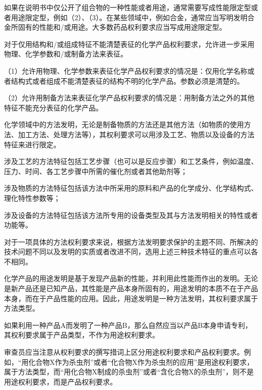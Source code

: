 如果在说明书中仅公开了组合物的一种性能或者用途，通常需要写成性能限定型或者用途限定型，例如（2）、（3）。在某些领域中，例如合金，通常应当写明发明合金所固有的性能和/或用途。大多数药品权利要求应当写成用途限定型。

对于仅用结构和/或组成特征不能清楚表征的化学产品权利要求，允许进一步采用物理、化学参数和/或制备方法来表征。

{\setlength{\parindent}{17.1bp}（1）允许用物理、化学参数来表征化学产品权利要求的情况是：仅用化学名称或者结构式或者组成不能清楚表征的结构不明的化学产品。参数必须是清楚的。\par}

{\setlength{\parindent}{17.1bp}（2）允许用制备方法来表征化学产品权利要求的情况是：用制备方法之外的其他特征不能充分表征的化学产品。\par}

化学领域中的方法发明，无论是制备物质的方法还是其他方法（如物质的使用方法、加工方法、处理方法等），其权利要求可以用涉及工艺、物质以及设备的方法特征来进行限定。

涉及工艺的方法特征包括工艺步骤（也可以是反应步骤）和工艺条件，例如温度、压力、时间、各工艺步骤中所需的催化剂或者其他助剂等；

涉及物质的方法特征包括该方法中所采用的原料和产品的化学成分、化学结构式、理化特性参数等；

涉及设备的方法特征包括该方法所专用的设备类型及其与方法发明相关的特性或者功能等。

对于一项具体的方法权利要求来说，根据方法发明要求保护的主题不同、所解决的技术问题不同以及发明的实质或者改进不同，选用上述三种技术特征的重点可以各不相同。

化学产品的用途发明是基于发现产品新的性能，并利用此性能而作出的发明。无论是新产品还是已知产品，其性能是产品本身所固有的，用途发明的本质不在于产品本身，而在于产品性能的应用。因此，用途发明是一种方法发明，其权利要求属于方法类型。

如果利用一种产品A而发明了一种产品B，那么自然应当以产品B本身申请专利，其权利要求属于产品类型，不作为用途权利要求。

审查员应当注意从权利要求的撰写措词上区分用途权利要求和产品权利要求。例如，“用化合物X作为杀虫剂”或者“化合物X作为杀虫剂的应用”是用途权利要求，属于方法类型，而“用化合物X制成的杀虫剂”或者“含化合物X的杀虫剂”，则不是用途权利要求，而是产品权利要求。

